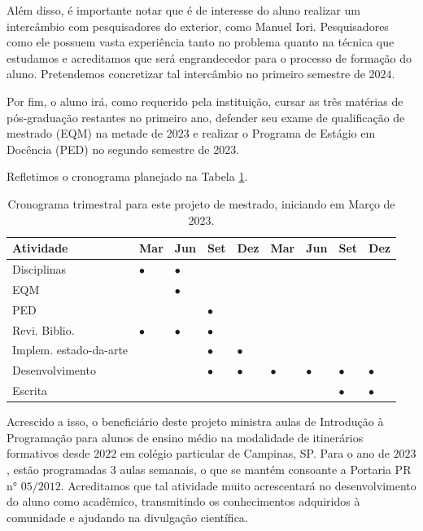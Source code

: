 \documentclass[11pt]{article}
\begin{document}
Além disso, é importante notar que é de interesse do aluno realizar um intercâmbio com pesquisadores do exterior, como Manuel Iori.
Pesquisadores como ele possuem vasta experiência tanto no problema quanto na técnica que estudamos e acreditamos que será engrandecedor para o processo de formação do aluno.
Pretendemos concretizar tal intercâmbio no primeiro semestre de \(2024\).

Por fim, o aluno irá, como requerido pela instituição, cursar as três matérias de pós-graduação restantes no primeiro ano, defender seu exame de qualificação de mestrado (EQM) na metade de 2023 e realizar o Programa de Estágio em Docência (PED) no segundo semestre de 2023.

Refletimos o cronograma planejado na Tabela \ref{tab:cron}.

\begin{table}[htbp]
\caption{\label{tab:cron}Cronograma trimestral para este projeto de mestrado, iniciando em Março de 2023.}
\centering
\begin{tabular}{lllllllll}
Atividade & Mar & Jun & Set & Dez & Mar & Jun & Set & Dez\\[0pt]
\hline
Disciplinas & \(\bullet\) & \(\bullet\) &  &  &  &  &  & \\[0pt]
EQM &  & \(\bullet\) &  &  &  &  &  & \\[0pt]
PED &  &  & \(\bullet\) &  &  &  &  & \\[0pt]
Revi. Biblio. & \(\bullet\) & \(\bullet\) & \(\bullet\) &  &  &  &  & \\[0pt]
Implem. estado-da-arte &  &  & \(\bullet\) & \(\bullet\) &  &  &  & \\[0pt]
Desenvolvimento &  &  & \(\bullet\) & \(\bullet\) & \(\bullet\) & \(\bullet\) & \(\bullet\) & \(\bullet\)\\[0pt]
Escrita &  &  &  &  &  &  & \(\bullet\) & \(\bullet\)\\[0pt]
\end{tabular}
\end{table}
Acrescido a isso, o beneficiário deste projeto ministra aulas de Introdução à Programação para alunos de ensino médio na modalidade de itinerários formativos desde \(2022\) em colégio particular de Campinas, SP.
Para o ano de \(2023\), estão programadas \(3\) aulas semanais, o que se mantém consoante a Portaria PR n° \(05/2012\).
Acreditamos que tal atividade muito acrescentará no desenvolvimento do aluno como acadêmico, transmitindo os conhecimentos adquiridos à comunidade e ajudando na divulgação científica.
\end{document}
